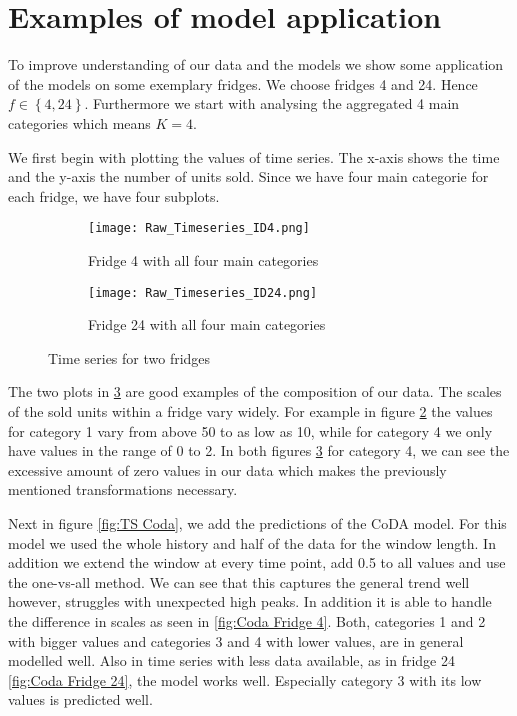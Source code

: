 \section{Examples of model application}
\label{sec:Examples of model applicatio}

To improve understanding of our data and the models we show some application of the models on some exemplary fridges. We choose fridges 4 and 24. Hence $f \in \left\{4,24\right\}$. Furthermore we start with analysing the aggregated 4 main categories which means $K=4$. 

We first begin with plotting the values of time series. The x-axis shows the time and the y-axis the number of units sold. Since we have four main categorie for each fridge, we have four subplots. 

\begin{figure}[htb]
\centering
\begin{subfigure}[b]{0.45\textwidth}
\texttt{[image: Raw\_Timeseries\_ID4.png]} 
\caption{Fridge 4 with all four main categories}
\label{fig:TS Fridge 4}
\end{subfigure}
\hfill
\begin{subfigure}[b]{0.45\textwidth}
\texttt{[image: Raw\_Timeseries\_ID24.png]} 
\caption{Fridge 24 with all four main categories}
\label{fig:TS Fridge 24}
\end{subfigure}
\caption{Time series for two fridges}
\label{fig:TS raw}
\end{figure}


The two plots in \ref{fig:TS raw} are good examples of the composition of our data. The scales of the sold units within a fridge vary widely. For example in figure \ref{fig:TS Fridge 24} the values for category 1 vary from above 50 to as low as 10, while for category 4 we only have values in the range of 0 to 2. In both figures \ref{fig:TS raw} for category 4, we can see the excessive amount of zero values in our data which makes the previously mentioned transformations necessary. 

Next in figure \ref{fig:TS Coda}, we add the predictions of the CoDA model. For this model we used the whole history and half of the data for the window length. In addition we extend the window at every time point, add 0.5 to all values and use the one-vs-all method. We can see that this captures the general trend well however, struggles with unexpected high peaks. In addition it is able to handle the difference in scales as seen in \ref{fig:Coda Fridge 4}. Both, categories 1 and 2 with bigger values and categories 3 and 4 with lower values, are in general modelled well. Also in time series with less data available, as in fridge 24 \ref{fig:Coda Fridge 24}, the model works well. Especially category 3 with its low values is predicted well. 

